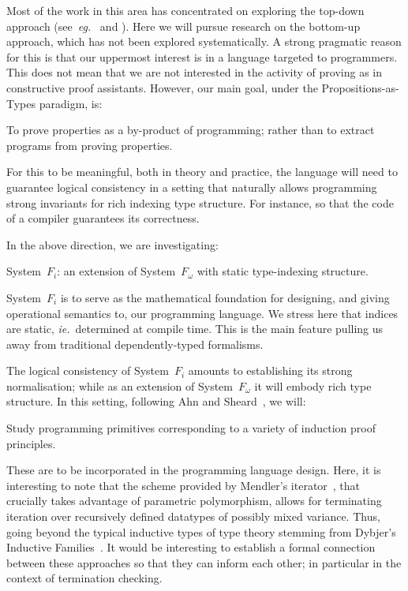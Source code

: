 \documentclass[11pt,twocolumn]{article}
\newcounter{CC}
\newenvironment{resenumerate}
  {\begin{list}{[\textbf{\arabic{CC}]}}
  {\usecounter{CC}
   \setlength{\topsep}{2pt}
   \setlength{\partopsep}{2pt}
   \setlength{\itemsep}{2.5pt}
   \setlength{\parsep}{2.5pt}
   \setlength{\leftmargin}{1.65em}
   \setlength{\labelwidth}{1.15em}
 }}
  {\end{list}}
\newcommand{\eg}{\emph{eg.}}
\newcommand{\ie}{\emph{ie.}}
\newcommand{\SystemFi}{\mbox{System~$F_i$}}
\newcommand{\SystemFomega}{\mbox{System~$F_\omega$}}
\begin{document}
Most of the work in this area has concentrated on exploring the top-down
approach (see~\eg~\cite{Cayenne} and \cite{Epigram}).  Here we will pursue
research on the bottom-up approach, which has not been explored
systematically.  A strong pragmatic reason for this is that our uppermost
interest is in a language targeted to programmers.  This does not mean that we
are not interested in the activity of proving as in constructive proof
assistants.  However, our main goal, under the Propositions-as-Types paradigm,
is: 
\begin{resenumerate}\setcounter{CC}{1}
\item
  To prove properties as a by-product of programming; rather than to extract
  programs from proving properties.
\end{resenumerate}
For this to be meaningful, both in theory and practice, the language will
need to guarantee logical consistency in a setting that naturally allows
programming strong invariants for rich indexing type structure.  For
instance, so that the code of a compiler guarantees its correctness.

In the above direction, we are investigating:
\begin{resenumerate}\setcounter{CC}{2}
\item
  {\SystemFi}: an extension of {\SystemFomega} with static type-indexing
  structure.
\end{resenumerate}
{\SystemFi} is to serve as the mathematical foundation for designing, and
giving operational semantics to, our programming language.  We stress here
that indices are static, \ie~determined at compile time.  This is the main
feature pulling us away from traditional dependently-typed formalisms.

The logical consistency of {\SystemFi} amounts to establishing its strong
normalisation; while as an extension of {\SystemFomega} it will embody
rich type structure.  In this setting, following Ahn and
Sheard~\cite{AhnSheard11}, we will:
\begin{resenumerate}\setcounter{CC}{3}
\item
  Study programming primitives corresponding to a variety of induction
  proof principles.
\end{resenumerate}
These are to be incorporated in the programming language design.  Here, it
is interesting to note that the scheme provided by Mendler's
iterator~\cite{MendlerIter}, that crucially takes advantage of
parametric polymorphism, allows for terminating iteration over recursively
defined datatypes of possibly mixed variance.  Thus, going beyond the
typical inductive types of type theory stemming from Dybjer's Inductive
Families~\cite{DybjerIF}.  It would be interesting to establish a formal
connection between these approaches so that they can inform each other;
in particular in the context of termination checking. %
\end{document}
